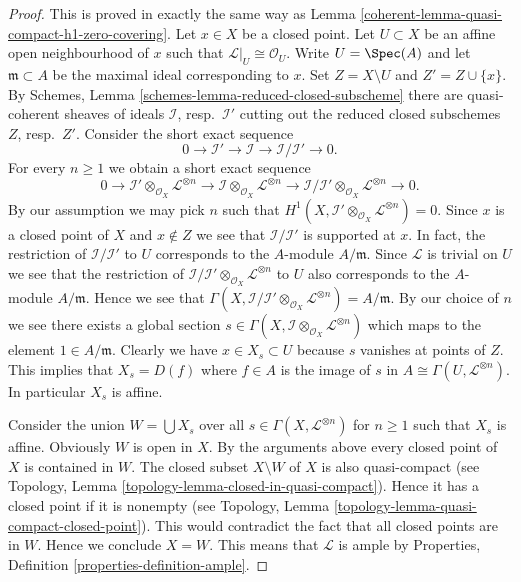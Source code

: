 \begin{proof}

This is proved in exactly the same way as
Lemma \ref{coherent-lemma-quasi-compact-h1-zero-covering}.
Let $x \in X$ be a closed point. Let $U \subset X$ be an affine open
neighbourhood of $x$ such that $\mathcal{L}|_U \cong \mathcal{O}_U$.
Write $U = \Spec(A)$ and let
$\mathfrak m \subset A$ be the maximal ideal corresponding to $x$.
Set $Z = X \setminus U$ and $Z' = Z \cup \{x\}$.
By Schemes, Lemma \ref{schemes-lemma-reduced-closed-subscheme} there
are quasi-coherent sheaves of ideals
$\mathcal{I}$, resp.\ $\mathcal{I}'$ cutting out
the reduced closed subschemes $Z$, resp.\ $Z'$.
Consider the short exact sequence
$$
0 \to \mathcal{I}' \to \mathcal{I} \to \mathcal{I}/\mathcal{I}' \to 0.
$$
For every $n \geq 1$ we obtain a short exact sequence
$$
0 \to \mathcal{I}' \otimes_{\mathcal{O}_X} \mathcal{L}^{\otimes n}
\to \mathcal{I} \otimes_{\mathcal{O}_X} \mathcal{L}^{\otimes n} \to
\mathcal{I}/\mathcal{I}' \otimes_{\mathcal{O}_X} \mathcal{L}^{\otimes n} \to 0.
$$
By our assumption we may pick $n$ such that
$H^1(X, \mathcal{I}' \otimes_{\mathcal{O}_X} \mathcal{L}^{\otimes n}) = 0$.
Since $x$ is a closed point of $X$ and $x \not \in Z$ we see that
$\mathcal{I}/\mathcal{I}'$ is supported at $x$. In fact, the restriction
of $\mathcal{I}/\mathcal{I'}$ to $U$ corresponds to the $A$-module
$A/\mathfrak m$. Since $\mathcal{L}$ is trivial on $U$
we see that the restriction of
$\mathcal{I}/\mathcal{I}' \otimes_{\mathcal{O}_X} \mathcal{L}^{\otimes n}$
to $U$ also corresponds to the $A$-module $A/\mathfrak m$.
Hence we see that
$\Gamma(X, \mathcal{I}/\mathcal{I'} \otimes_{\mathcal{O}_X}
\mathcal{L}^{\otimes n}) = A/\mathfrak m$.
By our choice of $n$ we see there exists a global section
$s \in \Gamma(X, \mathcal{I} \otimes_{\mathcal{O}_X} \mathcal{L}^{\otimes n})$
which maps to the element $1 \in A/\mathfrak m$. Clearly we have
$x \in X_s \subset U$ because $s$ vanishes at points of $Z$.
This implies that $X_s = D(f)$ where
$f \in A$ is the image of $s$ in $A \cong \Gamma(U, \mathcal{L}^{\otimes n})$.
In particular $X_s$ is affine.

\medskip\noindent
Consider the union $W = \bigcup X_s$ over all
$s \in \Gamma(X, \mathcal{L}^{\otimes n})$ for $n \geq 1$
such that $X_s$ is affine. Obviously $W$ is open in $X$.
By the arguments above every closed point of
$X$ is contained in $W$. The closed subset $X \setminus W$ of $X$
is also quasi-compact
(see Topology, Lemma \ref{topology-lemma-closed-in-quasi-compact}).
Hence it has a closed point if it is nonempty (see
Topology, Lemma \ref{topology-lemma-quasi-compact-closed-point}).
This would contradict the fact that all closed points are in
$W$. Hence we conclude $X = W$. This means that $\mathcal{L}$
is ample by Properties, Definition \ref{properties-definition-ample}.
\end{proof}

